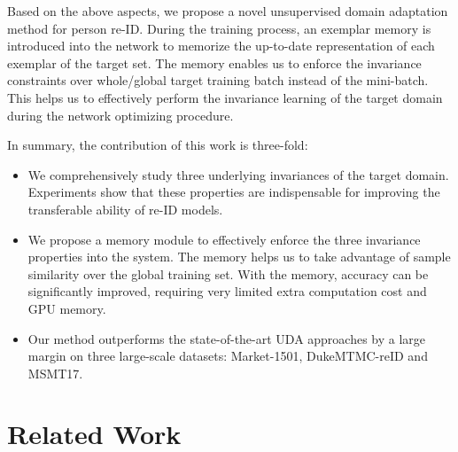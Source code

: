 \documentclass[10pt,twocolumn,letterpaper]{article}
\begin{document}
Based on the above aspects, we propose a novel unsupervised domain adaptation method for person re-ID. During the training process, an exemplar memory is introduced into the network to memorize the up-to-date representation of each exemplar of the target set. The memory enables us to enforce the invariance constraints over whole/global target training batch instead of the mini-batch. This helps us to effectively perform the invariance learning of the target domain during the network optimizing procedure. 

In summary, the contribution of this work is three-fold: 
\vspace{-.07in}
\begin{itemize}
\item We comprehensively study three underlying invariances of the target domain. Experiments show that these properties are indispensable for improving the transferable ability of re-ID models.
\vspace{-.09in}
\item We propose a memory module to effectively enforce the three invariance properties into the system. The memory helps us to take advantage of sample similarity over the global training set. With the memory, accuracy can be significantly improved, requiring very limited extra computation cost and GPU memory.
\vspace{-.03in}
\item Our method outperforms the state-of-the-art UDA approaches by a large margin on three large-scale datasets: Market-1501, DukeMTMC-reID and MSMT17.
\end{itemize}


\section{Related Work}
\end{document}
